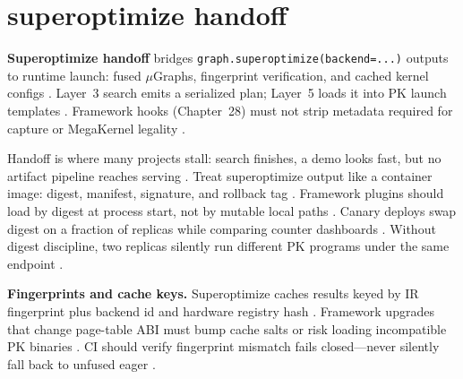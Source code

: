 \section{superoptimize handoff}
\label{sec:ch29_superoptimize_handoff}

\textbf{Superoptimize handoff} bridges \texttt{graph.superoptimize(backend=...)} outputs to runtime launch: fused $\mu$Graphs, fingerprint verification, and cached kernel configs \citep{yirage2026,chen2020compilerbasedhardw,taxbreak2026,memoryfloor2026,patel2025llminference,kwon2023vllm,liu2024deepseekv3,dao2022flashattention,semianalysis2024tma,amd2024xdna,amd2024aie,nvidia2022hopper,nvidia2024cudagraphs,dao2023flashdecoding,dlbook}. Layer~3 search emits a serialized plan; Layer~5 loads it into PK launch templates \citep{yirage2026,chen2020compilerbasedhardw,patel2025llminference,dlbook}. Framework hooks (Chapter~28) must not strip metadata required for capture or MegaKernel legality \citep{yirage2026,nvidia2024cudagraphs,chen2020compilerbasedhardw,patel2025llminference,taxbreak2026,memoryfloor2026,dlbook,kwon2023vllm,dao2022flashattention,liu2024deepseekv3,semianalysis2024tma,amd2024aie,amd2024xdna,dao2023flashdecoding,nvidia2022hopper,dlbook}.

Handoff is where many projects stall: search finishes, a demo looks fast, but no artifact pipeline reaches serving \citep{yirage2026,chen2020compilerbasedhardw,patel2025llminference,dlbook}. Treat superoptimize output like a container image: digest, manifest, signature, and rollback tag \citep{yirage2026,chen2020compilerbasedhardw,patel2025llminference,dlbook}. Framework plugins should load by digest at process start, not by mutable local paths \citep{kwon2023vllm,yirage2026,chen2020compilerbasedhardw,patel2025llminference,dlbook}. Canary deploys swap digest on a fraction of replicas while comparing counter dashboards \citep{patel2025llminference,taxbreak2026,memoryfloor2026,yirage2026,chen2020compilerbasedhardw,kwon2023vllm,dlbook}. Without digest discipline, two replicas silently run different PK programs under the same endpoint \citep{yirage2026,chen2020compilerbasedhardw,patel2025llminference,kwon2023vllm,dlbook}.

\textbf{Fingerprints and cache keys.} Superoptimize caches results keyed by IR fingerprint plus backend id and hardware registry hash \citep{yirage2026,chen2020compilerbasedhardw,patel2025llminference,taxbreak2026,memoryfloor2026,kwon2023vllm,dlbook,nvidia2024cudagraphs,dao2022flashattention,liu2024deepseekv3,semianalysis2024tma,amd2024xdna,amd2024aie,dao2023flashdecoding,nvidia2022hopper,dlbook}. Framework upgrades that change page-table ABI must bump cache salts or risk loading incompatible PK binaries \citep{kwon2023vllm,yirage2026,chen2020compilerbasedhardw,patel2025llminference,memoryfloor2026,taxbreak2026,dlbook}. CI should verify fingerprint mismatch fails closed---never silently fall back to unfused eager \citep{yirage2026,chen2020compilerbasedhardw,patel2025llminference,taxbreak2026,memoryfloor2026,kwon2023vllm,nvidia2024cudagraphs,dao2022flashattention,dlbook}.

